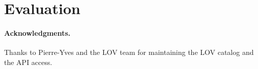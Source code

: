\documentclass{sig-alternate}
\begin{document}
\section{Evaluation}\label{sec:conclusion}




\paragraph{\textbf{Acknowledgments.}} %
Thanks to Pierre-Yves and the LOV team for maintaining the LOV catalog and the API access.



\balancecolumns
\end{document}
